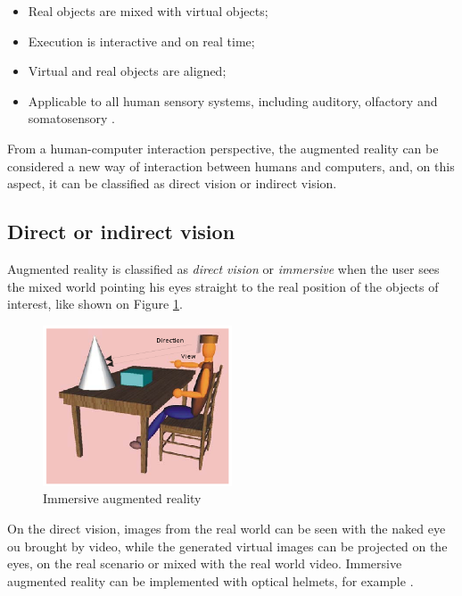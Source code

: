\documentclass[msc, a4paper, classic, en]{ufbathesis}
\begin{document}
\begin{itemize}
  \item Real objects are mixed with virtual objects;
  \item Execution is interactive and on real time;
  \item Virtual and real objects are aligned;
  \item Applicable to all human sensory systems, including auditory, olfactory and somatosensory \cite{8}.
\end{itemize}

From a human-computer interaction perspective, the augmented reality can be considered a new way of interaction between humans and computers, and, on this aspect, it can be classified as direct vision or indirect vision.

\subsection{Direct or indirect vision}

Augmented reality is classified as \textit{direct vision} or \textit{immersive} when the user sees the mixed world pointing his eyes straight to the real position of the objects of interest, like shown on Figure \ref{fig:direct}.

\begin{figure}
\label{fig:direct}
\centering
\includegraphics[width=0.5\textwidth]{images/direct.png}
\caption{Immersive augmented reality}
\end{figure}

On the direct vision, images from the real world can be seen with the naked eye ou brought by video, while the generated virtual images can be projected on the eyes, on the real scenario or mixed with the real world video. Immersive augmented reality can be implemented with optical helmets, for example \cite{1}.
\end{document}
